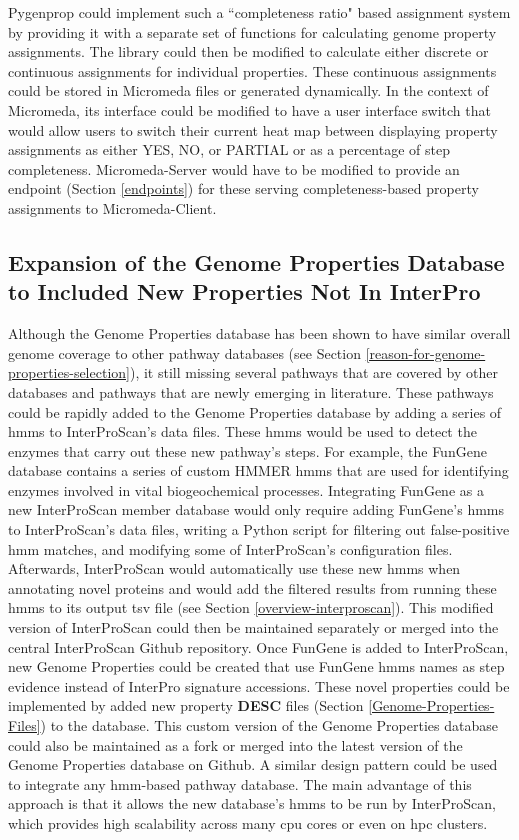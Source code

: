 Pygenprop could implement such a ``completeness ratio" based assignment system by providing it with a separate set of functions for calculating genome property assignments. The library could then be modified to calculate either discrete or continuous assignments for individual properties. These continuous assignments could be stored in Micromeda files or generated dynamically. In the context of Micromeda, its interface could be modified to have a user interface switch that would allow users to switch their current heat map between displaying property assignments as either YES, NO, or PARTIAL or as a percentage of step completeness. Micromeda-Server would have to be modified to provide an endpoint (Section \ref{endpoints}) for these serving completeness-based property assignments to Micromeda-Client.

\subsection{Expansion of the Genome Properties Database to Included New Properties Not In InterPro}

Although the Genome Properties database has been shown to have similar overall genome coverage to other pathway databases (see Section \ref{reason-for-genome-properties-selection}), it still missing several pathways that are covered by other databases and pathways that are newly emerging in literature. These pathways could be rapidly added to the Genome Properties database by adding a series of \gls{hmm}s \cite{eddy2011accelerated} to InterProScan's data files. These \gls{hmm}s would be used to detect the enzymes that carry out these new pathway's steps. For example, the FunGene \cite{fish2013fungene} database contains a series of custom HMMER \cite{eddy2011accelerated} \gls{hmm}s that are used for identifying enzymes involved in vital biogeochemical processes. Integrating FunGene as a new InterProScan member database would only require adding FunGene's \gls{hmm}s to InterProScan's data files, writing a Python script for filtering out false-positive \gls{hmm} matches, and modifying some of InterProScan's configuration files. Afterwards, InterProScan would automatically use these new \gls{hmm}s when annotating novel proteins and would add the filtered results from running these \gls{hmm}s to its output \gls{tsv} file (see Section \ref{overview-interproscan}). This modified version of InterProScan could then be maintained separately or merged into the central InterProScan Github repository. Once FunGene is added to InterProScan, new Genome Properties could be created that use FunGene \gls{hmm}s names as step evidence instead of InterPro signature accessions. These novel properties could be implemented by added new property \textbf{DESC} files (Section \ref{Genome-Properties-Files}) to the database. This custom version of the Genome Properties database could also be maintained as a fork or merged into the latest version of the Genome Properties database on Github. A similar design pattern could be used to integrate any \gls{hmm}-based pathway database. The main advantage of this approach is that it allows the new database's \gls{hmm}s to be run by InterProScan, which provides high scalability across many \gls{cpu} cores or even on \gls{hpc} clusters.

